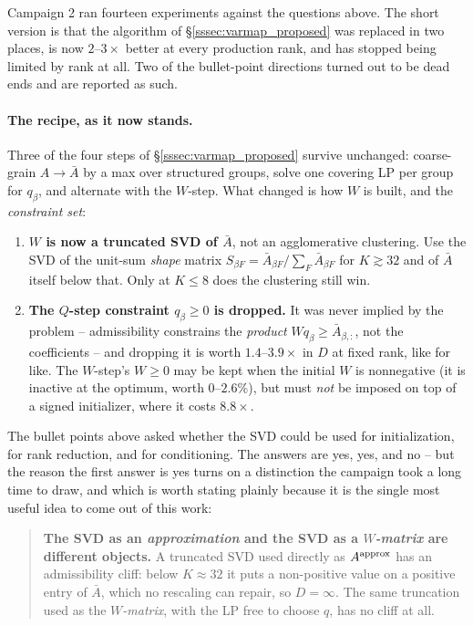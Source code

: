 \documentclass{article}
\numberwithin{equation}{section}   %
\begin{document}
Campaign 2 ran fourteen experiments against the questions above. The short version is that the
algorithm of \S\ref{sssec:varmap_proposed} was replaced in two places, is now $2$--$3\times$
better at every production rank, and has stopped being limited by rank at all. Two of the
bullet-point directions turned out to be dead ends and are reported as such.

\paragraph{The recipe, as it now stands.}
Three of the four steps of \S\ref{sssec:varmap_proposed} survive unchanged: coarse-grain
$A \rightarrow \bar A$ by a max over structured groups, solve one covering LP per group for
$q_\beta$, and alternate with the $W$-step. What changed is how $W$ is built, and the
{\em constraint set}:

\begin{enumerate}
\item {\bf $W$ is now a truncated SVD of $\bar A$}, not an agglomerative clustering.
 Use the SVD of the unit-sum {\em shape} matrix $S_{\beta F} = \bar A_{\beta F}/\sum_F \bar A_{\beta F}$
 for $K \gtrsim 32$ and of $\bar A$ itself below that. Only at $K \le 8$ does the clustering
 still win.
\item {\bf The $Q$-step constraint $q_\beta \ge 0$ is dropped.} It was never implied by the
 problem -- admissibility constrains the {\em product} $W q_\beta \ge \bar A_{\beta,:}$, not the
 coefficients -- and dropping it is worth $1.4$--$3.9\times$ in $D$ at fixed rank, like for like.
 The $W$-step's $W \ge 0$ may be kept when the initial $W$ is nonnegative (it is inactive at the
 optimum, worth $0$--$2.6\%$), but must {\em not} be imposed on top of a signed initializer,
 where it costs $8.8\times$.
\end{enumerate}

\par\noindent
The bullet points above asked whether the SVD could be used for initialization, for rank
reduction, and for conditioning. The answers are yes, yes, and no -- but the reason the first
answer is yes turns on a distinction the campaign took a long time to draw, and which is worth
stating plainly because it is the single most useful idea to come out of this work:

\begin{quote}
{\bf The SVD as an {\em approximation} and the SVD as a {\em $W$-matrix} are different objects.}
A truncated SVD used directly as $A^{\rm approx}$ has an admissibility cliff: below $K \approx 32$
it puts a non-positive value on a positive entry of $\bar A$, which no rescaling can repair, so
$D = \infty$. The same truncation used as the {\em $W$-matrix}, with the LP free to choose
$q$, has no cliff at all.
\end{quote}
\end{document}
